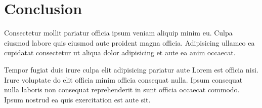 \section{Conclusion}

Consectetur mollit pariatur officia ipsum veniam aliquip minim eu. Culpa eiusmod labore quis eiusmod aute proident magna officia. Adipisicing ullamco ea cupidatat consectetur ut aliqua dolor adipisicing et aute ea anim occaecat.

Tempor fugiat duis irure culpa elit adipisicing pariatur aute Lorem est officia nisi. Irure voluptate do elit officia minim officia consequat nulla. Ipsum consequat nulla laboris non consequat reprehenderit in sunt officia occaecat commodo. Ipsum nostrud ea quis exercitation est aute sit.